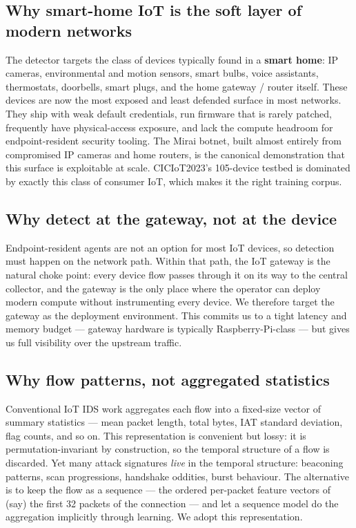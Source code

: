 \documentclass[11pt,a4paper]{article}
\begin{document}
\subsection{Why smart-home IoT is the soft layer of modern networks}
The detector targets the class of devices typically found in a \textbf{smart home}: IP cameras, environmental and motion sensors, smart bulbs, voice assistants, thermostats, doorbells, smart plugs, and the home gateway / router itself. These devices are now the most exposed and least defended surface in most networks. They ship with weak default credentials, run firmware that is rarely patched, frequently have physical-access exposure, and lack the compute headroom for endpoint-resident security tooling. The Mirai botnet, built almost entirely from compromised IP cameras and home routers, is the canonical demonstration that this surface is exploitable at scale. CICIoT2023's 105-device testbed is dominated by exactly this class of consumer IoT, which makes it the right training corpus.

\subsection{Why detect at the gateway, not at the device}
Endpoint-resident agents are not an option for most IoT devices, so detection must happen on the network path. Within that path, the IoT gateway is the natural choke point: every device flow passes through it on its way to the central collector, and the gateway is the only place where the operator can deploy modern compute without instrumenting every device. We therefore target the gateway as the deployment environment. This commits us to a tight latency and memory budget --- gateway hardware is typically Raspberry-Pi-class --- but gives us full visibility over the upstream traffic.

\subsection{Why flow patterns, not aggregated statistics}
Conventional IoT IDS work aggregates each flow into a fixed-size vector of summary statistics --- mean packet length, total bytes, IAT standard deviation, flag counts, and so on. This representation is convenient but lossy: it is permutation-invariant by construction, so the temporal structure of a flow is discarded. Yet many attack signatures \emph{live} in the temporal structure: beaconing patterns, scan progressions, handshake oddities, burst behaviour. The alternative is to keep the flow as a sequence --- the ordered per-packet feature vectors of (say) the first 32 packets of the connection --- and let a sequence model do the aggregation implicitly through learning. We adopt this representation.
\end{document}

